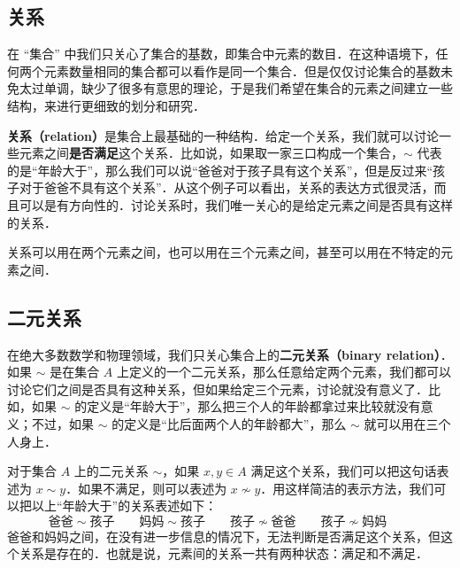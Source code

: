 

\subsection{关系}

在 “集合” 中我们只关心了集合的基数，即集合中元素的数目．在这种语境下，任何两个元素数量相同的集合都可以看作是同一个集合．但是仅仅讨论集合的基数未免太过单调，缺少了很多有意思的理论，于是我们希望在集合的元素之间建立一些结构，来进行更细致的划分和研究．

\textbf{关系（relation）}是集合上最基础的一种结构．给定一个关系，我们就可以讨论一些元素之间\textbf{是否满足}这个关系．比如说，如果取一家三口构成一个集合，$\sim$ 代表的是“年龄大于”，那么我们可以说“爸爸对于孩子具有这个关系”，但是反过来“孩子对于爸爸不具有这个关系”．从这个例子可以看出，关系的表达方式很灵活，而且可以是有方向性的．讨论关系时，我们唯一关心的是给定元素之间是否具有这样的关系．

关系可以用在两个元素之间，也可以用在三个元素之间，甚至可以用在不特定的元素之间．

\subsection{二元关系}

在绝大多数数学和物理领域，我们只关心集合上的\textbf{二元关系（binary relation）}．如果 $\sim$ 是在集合 $A$ 上定义的一个二元关系，那么任意给定两个元素，我们都可以讨论它们之间是否具有这种关系，但如果给定三个元素，讨论就没有意义了．比如，如果 $\sim$ 的定义是“年龄大于”，那么把三个人的年龄都拿过来比较就没有意义；不过，如果 $\sim$ 的定义是“比后面两个人的年龄都大”，那么 $\sim$ 就可以用在三个人身上．

对于集合 $A$ 上的二元关系 $\sim$，如果 $x, y\in A$ 满足这个关系，我们可以把这句话表述为 $x\sim y$．如果不满足，则可以表述为 $x\not\sim y$．用这样简洁的表示方法，我们可以把以上“年龄大于”的关系表述如下：
\begin{equation}
\text{爸爸}\sim\text{孩子} \qquad
\text{妈妈}\sim\text{孩子} \qquad
\text{孩子}\not\sim\text{爸爸} \qquad
\text{孩子}\not\sim\text{妈妈} \qquad
\end{equation}
爸爸和妈妈之间，在没有进一步信息的情况下，无法判断是否满足这个关系，但这个关系是存在的．也就是说，元素间的关系一共有两种状态：满足和不满足．

